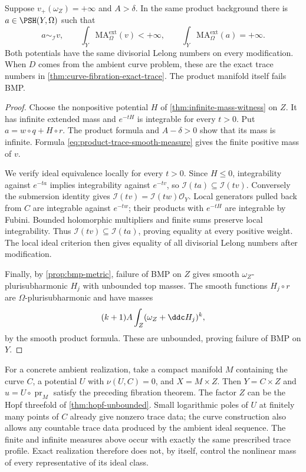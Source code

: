 \begin{proposition}\label{prop:exact-trace-infinite-representatives}
Suppose $v_+(\omega_Z)=+\infty$ and $A>\delta$. In the same product background there is $a\in\PSH(Y,\Omega)$ such that
\[
 a\sim_{\mathcal I}v,\qquad
 \int_Y\mathrm{MA}^{\mathrm{ext}}_\Omega(v)<+\infty,
 \qquad
 \int_Y\mathrm{MA}^{\mathrm{ext}}_\Omega(a)=+\infty.
\]
Both potentials have the same divisorial Lelong numbers on every modification. When $D$ comes from the ambient curve problem, these are the exact trace numbers in \cref{thm:curve-fibration-exact-trace}. The product manifold itself fails BMP.
\end{proposition}
\begin{proof}
Choose the nonpositive potential $H$ of \cref{thm:infinite-mass-witness} on $Z$. It has infinite extended mass and $e^{-tH}$ is integrable for every $t>0$. Put $a=w\circ q+H\circ r$. The product formula and $A-\delta>0$ show that its mass is infinite. Formula \eqref{eq:product-trace-smooth-measure} gives the finite positive mass of $v$.

We verify ideal equivalence locally for every $t>0$. Since $H\leq0$, integrability against $e^{-ta}$ implies integrability against $e^{-tv}$, so $\mathcal I(ta)\subseteq\mathcal I(tv)$. Conversely the submersion identity gives $\mathcal I(tv)=\mathcal I(tw)\mathcal O_Y$. Local generators pulled back from $C$ are integrable against $e^{-tw}$; their products with $e^{-tH}$ are integrable by Fubini. Bounded holomorphic multipliers and finite sums preserve local integrability. Thus $\mathcal I(tv)\subseteq\mathcal I(ta)$, proving equality at every positive weight. The local ideal criterion then gives equality of all divisorial Lelong numbers after modification.

Finally, by \cref{prop:bmp-metric}, failure of BMP on $Z$ gives smooth $\omega_Z$-plurisubharmonic $H_j$ with unbounded top masses. The smooth functions $H_j\circ r$ are $\Omega$-plurisubharmonic and have masses
\[
 (k+1)A\int_Z(\omega_Z+\ddc H_j)^k,
\]
by the smooth product formula. These are unbounded, proving failure of BMP on $Y$.
\end{proof}

For a concrete ambient realization, take a compact manifold $M$ containing the curve $C$, a potential $U$ with $\nu(U,C)=0$, and $X=M\times Z$. Then $Y=C\times Z$ and $u=U\circ\operatorname{pr}_M$ satisfy the preceding fibration theorem. The factor $Z$ can be the Hopf threefold of \cref{thm:hopf-unbounded}. Small logarithmic poles of $U$ at finitely many points of $C$ already give nonzero trace data; the curve construction also allows any countable trace data produced by the ambient ideal sequence. The finite and infinite measures above occur with exactly the same prescribed trace profile. Exact realization therefore does not, by itself, control the nonlinear mass of every representative of its ideal class.
